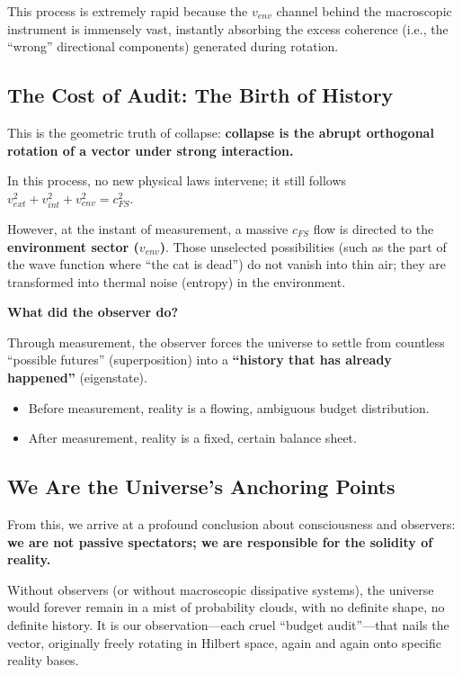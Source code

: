 This process is extremely rapid because the $v_{env}$ channel behind the macroscopic instrument is immensely vast, instantly absorbing the excess coherence (i.e., the ``wrong'' directional components) generated during rotation.

\subsection{The Cost of Audit: The Birth of History}

This is the geometric truth of collapse: \textbf{collapse is the abrupt orthogonal rotation of a vector under strong interaction.}

In this process, no new physical laws intervene; it still follows $v_{ext}^2 + v_{int}^2 + v_{env}^2 = c_{FS}^2$.

However, at the instant of measurement, a massive $c_{FS}$ flow is directed to the \textbf{environment sector ($v_{env}$)}. Those unselected possibilities (such as the part of the wave function where ``the cat is dead'') do not vanish into thin air; they are transformed into thermal noise (entropy) in the environment.

\textbf{What did the observer do?}

Through measurement, the observer forces the universe to settle from countless ``possible futures'' (superposition) into a \textbf{``history that has already happened''} (eigenstate).

\begin{itemize}
\item Before measurement, reality is a flowing, ambiguous budget distribution.

\item After measurement, reality is a fixed, certain balance sheet.
\end{itemize}

\subsection{We Are the Universe's Anchoring Points}

From this, we arrive at a profound conclusion about consciousness and observers: \textbf{we are not passive spectators; we are responsible for the solidity of reality.}

Without observers (or without macroscopic dissipative systems), the universe would forever remain in a mist of probability clouds, with no definite shape, no definite history. It is our observation---each cruel ``budget audit''---that nails the vector, originally freely rotating in Hilbert space, again and again onto specific reality bases.

